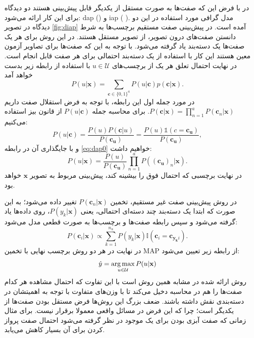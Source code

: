 در
\cite{lampert09}
با فرض این که صفت‌ها به صورت مستقل از یکدیگر قابل پیش‌بینی هستند دو دیدگاه برای این کار ارائه می‌شود: 
\gls{dap} ()
و 
\gls{iap} 
( ).
 مدل گرافی مورد استفاده در این دو دیدگاه در تصویر \ref{fig:diap} آمده است. در پیش‌بینی صفت مستقیم برچسب‌ها به شرط دانستن صفت‌های درون تصویر، از تصویر مستقل هستند. در این روش برای هر یک صفت‌ها یک دسته‌بند یاد گرفته می‌شود. با توجه به این که صفت‌ها برای تصاویر آزمون معین هستند این کار با استفاده از یک دسته‌بند احتمالی برای هر صفت قابل انجام است. در نهایت احتمال تعلق هر یک از برچسب‌های
$ u \in \mathcal{U} $
با استفاده از رابطه زیر بدست خواهد آمد
\begin{equation} \label{eq:dap0}
  P(u | \mathbf{x}  ) = \sum_{\mathbf{c} \in \{0,1\}^a} P(u | \mathbf{c} ) p(\mathbf{c} |\mathbf{x} ).
\end{equation}
در مورد جمله اول این رابطه، با توجه به فرض استقلال صفت داریم
$P(\mathbf{c} |\mathbf{x} ) = \prod_{n=1}^a P(\mathbf{c}_n |\mathbf{x} )$.
برای محاسبه جمله 
$P(u | \mathbf{c} )$ 
از قانون بیز استفاده می‌کنیم:
\[
P(u  | \mathbf{c} ) = \frac{P(u)P(\mathbf{c} |u)}{P(\mathbf{c_u} )}  = \frac {P(u) \mathds{1}(c= \mathbf{c_u} )} {P(\mathbf{c_u} )},
\]
و با جایگذاری آن در رابطه \eqref{eq:dap0} خواهیم داشت:
\begin{equation}
  P(u | \mathbf{x}  ) = \frac{P(u)}{P(\mathbf{c_u} )} \prod_{n=1}^a P((\mathbf{c}_{\mathbf{u}})_n|\mathbf{x} ).
\end{equation}
در نهایت برچسبی که احتمال فوق را بیشینه کند، پیش‌بینی مربوط به تصویر $\mathbf{x}$ خواهد بود.

در روش پیش‌بینی صفت غیر مستقیم،
 تخمین  $P(\mathbf{c}_n|\mathbf{x}) $ تغییر داده می‌شود؛ به این صورت که ابتدا یک دسته‌بند چند دسته‌ای احتمالی، یعنی $P(y_k |\mathbf{x})$، روی داده‌ها یاد گرفته می‌شود و سپس رابطه صفت‌ها و برچسب‌ها به صورت قطعی مدل می‌شود:
\begin{equation}
P(\mathbf{c}_i | \mathbf{x}) \propto \sum_{k=1}^{n_u} P(y_k | \mathbf{x}) \mathbb{I}(\mathbf{c}_i = \mathbf{c}_{\mathbf{y_k}i}).
\end{equation}
در نهایت در هر دو روش برچسب نهایی با تخمین \gls{MAP}
از رابطه زیر تعیین می‌شود:
\begin{equation}
\hat{y} = \operatorname*{arg\,max}_{u \in \mathcal{U}} P(u|\mathbf{x})
\end{equation}
روش ارائه شده در
\cite{suzuki14}
مشابه همین روش است با این تفاوت که احتمال مشاهده هر کدام صفت‌ها را هم در محاسبه دخیل می‌کند تا با وزن‌های متفاوت با توجه به اهمیتشان در دسته‌بندی نقش داشته باشند. ضعف بزرگ این روش‌ها فرض مستقل بودن صفت‌ها از یکدیگر است؛ چرا که این فرض در مسائل واقعی معمولا برقرار نیست. برای مثال زمانی که صفت آبزی بودن برای یک موجود در نظر گرفته می‌شود احتمال صفت پرواز کردن برای آن بسیار کاهش می‌یابد.
